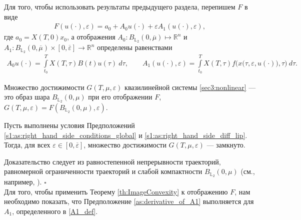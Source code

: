 \documentclass[../main.tex]{subfiles}
\begin{document}
Для того, чтобы использовать результаты предыдущего раздела, перепишем $F$ в виде
\begin{gather*}
 F(u(\cdot),\varepsilon) = a_0 + A_0 u(\cdot) + \varepsilon A_1(u(\cdot), \varepsilon), 
\end{gather*}
где $a_0 = X(T,0)x_0 $, а отображения $A_0: B_{\mathbb{L}_2}(0,\overline{\mu}) \mapsto \mathbb{R}^n$ и $A_1: B_{\mathbb{L}_2}(0,\overline{\mu}) \times [0,\overline{\varepsilon}] \to \mathbb{R}^n$ определены равенствами
\begin{gather}\label{A1_def}
 A_0 u(\cdot) = \int\limits_{t_0}^T X(T,\tau) B(t)u(\tau)\ d\tau, \qquad
 A_1(u(\cdot),\varepsilon) = \int\limits_{t_0}^T X(T,\tau) f\Big(x\big(\tau,\varepsilon, u(\cdot)\big),\tau\Big) \ d\tau.
\end{gather}

Множество достижимости $G(T,\mu,\varepsilon) $ квазилинейной системы \eqref{sec3:nonlinear} --- это образ шара $B_{\mathbb{L}_2}(0,\mu)$ при его отображении $F$, $G(T,\mu,\varepsilon) = F(B_{\mathbb{L}_2}(0,\mu),\varepsilon)$.

\begin{utv}\label{ReachableSetcloseness}
 Пусть выполнены условия Предположений \ref{s1:as:right_hand_side_conditions_global} и \ref{s1:as:right_hand_side_diff_lip}. 
Тогда, для всех $\varepsilon\in [0,\overline{\varepsilon}]$, множество достижимости $G(T,\mu,\varepsilon) $ --- замкнуто.
\end{utv}
\doc 
Доказательство следует из равностепенной непрерывности траекторий, равномерной ограниченности траекторий и слабой компактности $B_{\mathbb{L}_2}(0,\mu)$ (см., например, \cite{GusZyk}).
\hfill$\square$\\[1ex]%

Для того, чтобы применить Теорему \ref{th:ImageConvexity} к отображению $F$, нам необходимо показать, что Предположение \ref{as:derivative_of_A1} выполняется для $A_1$, определенного в \eqref{A1_def}.
\end{document}
